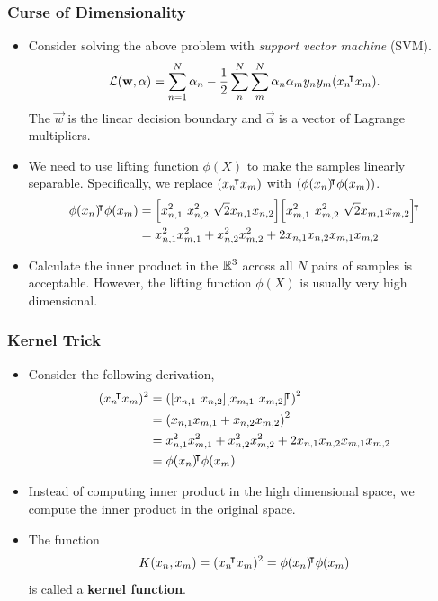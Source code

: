 \documentclass[10pt]{../formats/RU}
\begin{document}
\begin{frame}
\frametitle{Curse of Dimensionality}
\begin{itemize}
  \item<1-> Consider solving the above problem with \emph{support vector machine} (SVM).
  \begin{align*}
    \mathcal{L}(\mathbf{w}, \mathbf{\alpha}) = \sum_{n=1}^N\alpha_n - \frac{1}{2}\sum_{n}^{N}\sum_{m}^{N}\alpha_n\alpha_m y_ny_m(x_n{}^{\mkern-4mu\intercal} x_m).
  \end{align*}
  The $\vec{w}$ is the linear decision boundary and $\vec{\alpha}$ is a vector of Lagrange multipliers.
  \item <2-> We need to use lifting function $\phi(X)$ to make the samples linearly separable. Specifically, we replace $(x_n{}^{\mkern-4mu\intercal} x_m)$ with $(\phi(x_n){}^{\mkern-4mu\intercal}\phi(x_m))$.
  \begin{align*}
    \phi(x_n)\trn\phi(x_m) 
    &= \bracks*{x_{n,1}^2 \ x_{n,2}^2 \ \sqrt{2}x_{n,1}x_{n,2}}\bracks*{x_{m,1}^2 \ x_{m,2}^2 \ \sqrt{2}x_{m,1}x_{m,2}}\trn \\
    &= x_{n,1}^2x_{m,1}^2 + x_{n,2}^2x_{m,2}^2 + 2x_{n,1}x_{n,2}x_{m,1}x_{m,2}
  \end{align*}
  \item<3-> Calculate the inner product in the $\mathbb{R}^3$ across all $N$ pairs of samples is acceptable. However, the lifting function $\phi(X)$ is usually very high dimensional.
\end{itemize}
\end{frame}
\begin{frame}
  \frametitle{Kernel Trick}
  \begin{itemize}
    \item<1-> Consider the following derivation,
    \begin{align*}
      (x_n\trn x_m)^2 
      &= \parens*{\bracks*{x_{n,1} \ x_{n,2}}\bracks*{x_{m,1} \ x_{m,2}}\trn}^2 \\
      &= \parens*{x_{n,1}x_{m,1} + x_{n,2}x_{m,2}}^2 \\
      &= x_{n,1}^2x_{m,1}^2 + x_{n,2}^2x_{m,2}^2 + 2x_{n,1}x_{n,2}x_{m,1}x_{m,2} \\
      &= \phi(x_n)\trn\phi(x_m)
    \end{align*}
    \item<2-> Instead of computing inner product in the high dimensional space, we compute the inner product in the original space.
    \item<3-> The function 
    \begin{align*}
      K(x_n, x_m) = (x_n{}^{\mkern-4mu\intercal} x_m)^2 = \phi(x_n){}^{\mkern-4mu\intercal}\phi(x_m)
    \end{align*}
     is called a \textbf{kernel function}.
  \end{itemize}
\end{frame}
\end{document}
